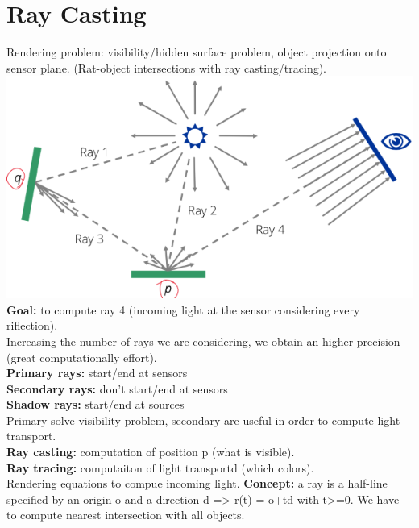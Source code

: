 \documentclass{article}
\begin{document}
\section{Ray Casting}
Rendering problem: visibility/hidden surface problem, object projection onto sensor plane. (Rat-object intersections with ray casting/tracing).\\
\includegraphics{image6.png}
\textbf{Goal:} to compute ray 4 (incoming light at the sensor considering every riflection).\\
Increasing the number of rays we are considering, we obtain an higher precision (great computationally effort).\\
\textbf{Primary rays: } start/end at sensors\\
\textbf{Secondary rays: } don't start/end at sensors\\
\textbf{Shadow rays: } start/end at sources\\
Primary solve visibility problem, secondary are useful in order to compute light transport.\\
\textbf{Ray casting: }computation of position p (what is visible).\\
\textbf{Ray tracing: }computaiton of light transportd (which colors).\\
Rendering equations to compue incoming light.
\textbf{Concept: }a ray is a half-line specified by an origin o and a direction d => r(t) = o+td with t>=0. We have to compute nearest intersection with all objects.
\end{document}
